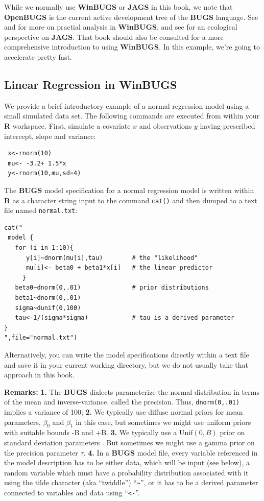While we normally use
{\bf WinBUGS} or {\bf JAGS} in this book, we note that {\bf
 OpenBUGS} is the current active development tree of the {\bf BUGS}
language. See \citet[][ch.xyz]{kery:2010} and
\citet[][appendix xyz]{kery_schaub:2011} for more on practial analysis
in {\bf WinBUGS}, and see \citet{hobbs:2011} for an ecological
perspective on {\bf JAGS}.
That book should also be consulted
for a more comprehensive introduction to using {\bf WinBUGS}. In this
example, we're going to accelerate pretty fast.

\subsection{Linear Regression in WinBUGS}

We provide a brief introductory example of a normal regression model
using a small simulated data set. The following commands are executed
from within your {\bf R} workspace.
First, simulate a covariate $x$ and observations $y$ having
prescribed intercept, slope and variance:
\begin{verbatim}
 x<-rnorm(10)
 mu<- -3.2+ 1.5*x
 y<-rnorm(10,mu,sd=4)
\end{verbatim}
The {\bf BUGS} model specification for a normal regression model is
written within {\bf R} as a character string input to the command
\mbox{\tt cat()} and
then dumped to a text file named \mbox{\tt normal.txt}:
\begin{verbatim}
cat("
 model {
   for (i in 1:10){
      y[i]~dnorm(mu[i],tau)        # the "likelihood"
      mu[i]<- beta0 + beta1*x[i]   # the linear predictor
     }
   beta0~dnorm(0,.01)              # prior distributions
   beta1~dnorm(0,.01)
   sigma~dunif(0,100)
   tau<-1/(sigma*sigma)            # tau is a derived parameter
}
",file="normal.txt")
\end{verbatim}
Alternatively, you
can write the model specifications directly within a text file and
save it in your current working directory, but we do not usually take
that approach in this book.

{\bf Remarks:} {\bf 1.} The {\bf BUGS} dialects parameterize the normal 
distribution in
terms of the mean and inverse-variance, called the precision. Thus,
\mbox{\tt dnorm(0,.01)} implies a variance of 100;
{\bf 2.} We typically use diffuse normal priors for mean parameters, $\beta_0$ and $\beta_1$ in this case, but sometimes we might use uniform priors with suitable bounds -B and +B.
{\bf 3.} We typically use a $\mbox{Unif}(0,B)$ prior on standard
deviation parameters
\citep{gelman:2006}.
But sometimes we might use a gamma prior on the precision parameter $\tau$.
{\bf 4.} In a {\bf BUGS} model file, every variable referenced in
the model description has to be
either data, which will be input (see below), a random variable which
must have a probability distribution associated with it using the
tilde character (aka ``twiddle'') ``\verb#~#'', or it has to be a derived parameter connected to variables and
data using ``\mbox{\tt <-}''.


